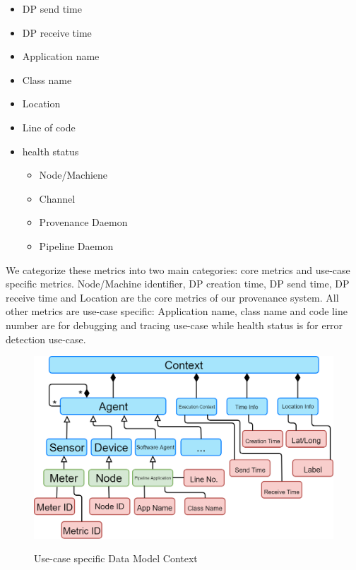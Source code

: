 \begin{itemize}
\begin{itemize}
			\item DP send time
			\item DP receive time
			\item Application name
			\item Class name
			\item Location
			\item Line of code 
			\item health status
				\begin{itemize}
					\item Node/Machiene
					\item Channel
					\item Provenance Daemon
					\item Pipeline Daemon
				\end{itemize}		
		\end{itemize}
We categorize these metrics into two main categories: core metrics and use-case specific metrics. Node/Machine identifier, DP creation time, DP send time, DP receive time and Location are the core metrics of our provenance system. All other metrics are use-case specific: Application name, class name and code line number are for debugging and tracing use-case while health status is for error detection use-case.

\begin{figure}[h]
\centering
\includegraphics[width=\linewidth]{figures/contextIdp.png}\\
\caption{Use-case specific Data Model Context}
\label{idpDataModelContext}
\end{figure}
		

\end{itemize}
